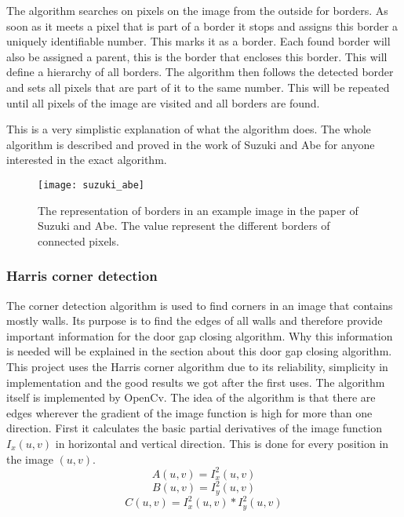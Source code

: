 The algorithm searches on pixels on the image from the outside for borders. As soon as it meets a pixel that is part of a border it stops and assigns this border a uniquely identifiable number. This marks it as a border. Each found border will also be assigned a parent, this is the border that encloses this border. This will define a hierarchy of all borders. The algorithm then follows the detected border and sets all pixels that are part of it to the same number. This will be repeated until all pixels of the image are visited and all borders are found.

This is a very simplistic explanation of what the algorithm does. The whole algorithm is described and proved in the work of Suzuki and Abe \cite{suzuki_abe_1985} for anyone interested in the exact algorithm.

\begin{figure}[h]
	\centering
	\texttt{[image: suzuki\_abe]}
	\caption{The representation of borders in an example image in the paper of Suzuki and Abe. The value represent the different borders of connected pixels.}
	\label{suzuki_abe}
\end{figure}


\subsubsection{Harris corner detection}
\label{subsubsec:HarrisCornerDetection}
The corner detection algorithm is used to find corners in an image that contains mostly walls. Its purpose is to find the edges of all walls and therefore provide important information for the door gap closing algorithm. Why this information is needed will be explained in the section about this door gap closing algorithm.
This project uses the Harris corner algorithm due to its reliability, simplicity in implementation and the good results we got after the first uses. The algorithm itself is implemented by OpenCv.
The idea of the algorithm is that there are edges wherever the gradient of the image function is high for more than one direction.
First it calculates the basic partial derivatives of the image function $I_{x}(u,v)$ in horizontal and vertical direction. This is done for every position in the image $(u,v)$.
\begin{equation}A(u,v) = I_{x}^2(u,v)\end{equation}
\begin{equation}B(u,v) = I_{y}^2(u,v)\end{equation}
\begin{equation}C(u,v) = I_{x}^2(u,v) * I_{y}^2(u,v)\end{equation}

